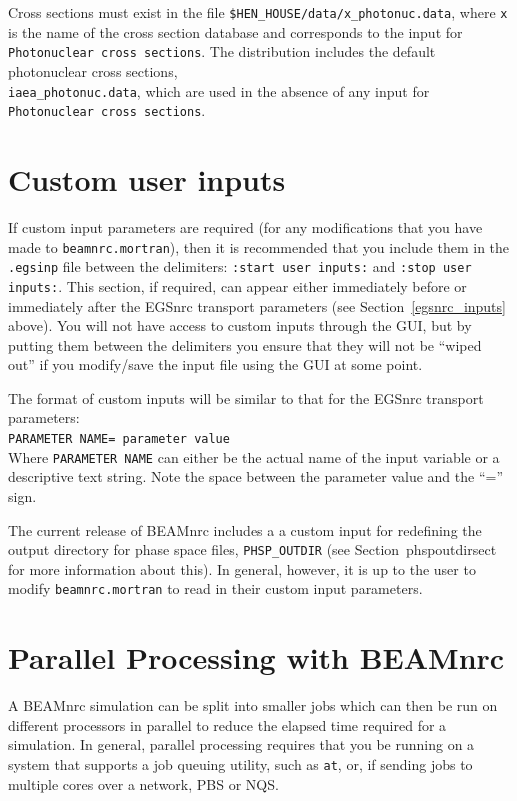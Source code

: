 \documentclass[12pt,twoside]{article}
\begin{document}
Cross sections must exist in the file \verb+$HEN_HOUSE/data/x_photonuc.data+,
where \verb+x+ is the name of the cross section database and corresponds to the
input for {\tt Photonuclear cross sections}.  The distribution includes the
default photonuclear cross sections,\\
\verb+iaea_photonuc.data+, which are used in the absence of any input for {\tt
Photonuclear cross sections}.

\section{Custom user inputs}
\label{custom_inputs}

If custom input parameters are required (for any modifications that you have
made to {\tt beamnrc.mortran}), then it is recommended that you
include them in the {\tt .egsinp} file between the delimiters:
{\tt :start user inputs:} and {\tt :stop user inputs:}.
This section, if required,
can appear either immediately before or immediately after the EGSnrc
transport parameters
(see Section~\ref{egsnrc_inputs} above).  You will not have access to custom
inputs through the GUI, but by putting them between the
delimiters you
ensure that they will not be ``wiped out'' if you modify/save the input
file using the GUI at some point.

The format of custom inputs will be similar to that for the EGSnrc
transport parameters:\\
{\tt PARAMETER NAME= parameter value}\\
Where {\tt PARAMETER NAME} can either be the actual name of the
input variable or a descriptive text string.  Note the space
between the parameter value and the ``='' sign.

The current release of BEAMnrc includes a
a custom input for
redefining the output directory for
phase space files, {\tt PHSP\_OUTDIR}
(see Section~{phspoutdirsect} for more information about this).
In general, however, it is up to the user to
modify {\tt beamnrc.mortran} to read in
their custom input parameters.

\section[Parallel Processing]{Parallel Processing with BEAMnrc}
\label{parallelcalc}

A BEAMnrc simulation can be split into smaller jobs which can then be run
on different processors in parallel to reduce the elapsed time required
for a simulation.  In general, parallel processing requires that you be running
on a system that supports a job queuing utility, such as {\tt at}, or, if
sending jobs to multiple cores over a network, PBS or NQS.
\end{document}
